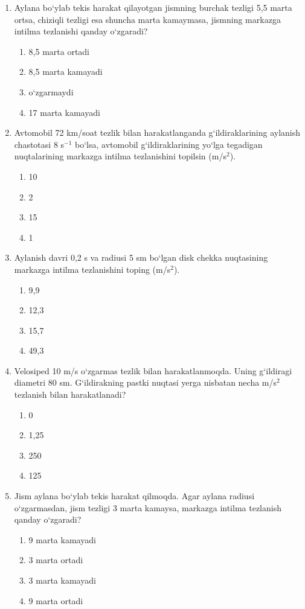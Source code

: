 \begin{enumerate}
\item Aylana bo‘ylab tekis harakat qilayotgan jismning burchak tezligi 5,5 marta ortsa, chiziqli tezligi esa shuncha marta kamaymasa, jismning markazga intilma tezlanishi qanday o‘zgaradi?
\begin{enumerate}[label=\Alph*)]
\item 8,5 marta ortadi
\item 8,5 marta kamayadi
\item o‘zgarmaydi
\item 17 marta kamayadi
\end{enumerate}

\item Avtomobil 72 km/soat tezlik bilan harakatlanganda g‘ildiraklarining aylanish chastotasi 8 s$^{-1}$ bo‘lsa, avtomobil g‘ildiraklarining yo‘lga tegadigan nuqtalarining markazga intilma tezlanishini topilsin (m/s$^2$).
\begin{enumerate}[label=\Alph*)]
\item 10
\item 2
\item 15
\item 1
\end{enumerate}

\item Aylanish davri 0,2 s va radiusi 5 sm bo‘lgan disk chekka nuqtasining markazga intilma tezlanishini toping (m/s$^2$).
\begin{enumerate}[label=\Alph*)]
\item 9,9
\item 12,3
\item 15,7
\item 49,3
\end{enumerate}

\item Velosiped 10 m/s o‘zgarmas tezlik bilan harakatlanmoqda. Uning g‘ildiragi diametri 80 sm. G‘ildirakning pastki nuqtasi yerga nisbatan necha m/s$^2$ tezlanish bilan harakatlanadi?
\begin{enumerate}[label=\Alph*)]
\item 0
\item 1,25
\item 250
\item 125
\end{enumerate}

\item Jism aylana bo‘ylab tekis harakat qilmoqda. Agar aylana radiusi o‘zgarmasdan, jism tezligi 3 marta kamaysa, markazga intilma tezlanish qanday o‘zgaradi?
\begin{enumerate}[label=\Alph*)]
\item 9 marta kamayadi
\item 3 marta ortadi
\item 3 marta kamayadi
\item 9 marta ortadi
\end{enumerate}


\end{enumerate}
